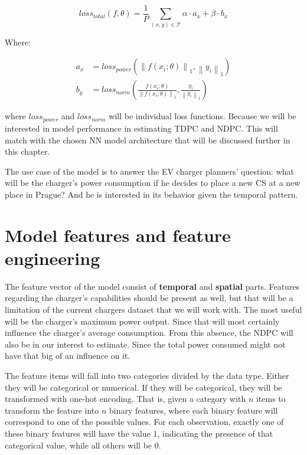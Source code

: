 \begin{equation}
    \mathit{loss_{total}}(f,\theta) = \frac{1}{P} \sum_{(x,y)\in\mathcal{T}} \alpha \cdot a_x + \beta \cdot b_x
\end{equation}

Where:

\begin{equation}
    \begin{split}
        a_x & = \mathit{loss_{power}}
        (\left \lVert f(x_i;\theta) \right \rVert_{1}, \left \lVert y_i \right \rVert_{1}) \\
        b_y & = \mathit{loss_{norm}}
        (\frac{f(x_i;\theta)}{\left \lVert f(x_i;\theta) \right \rVert_{1}}, \frac{y_i}{\left \lVert y_i \right \rVert_{1}})
    \end{split}
\end{equation}


where $\mathit{loss_{power}}$ and $\mathit{loss_{norm}}$ will be individual loss functions. Because we will be interested in model performance in estimating \acrfull{TDPC} and \acrfull{NDPC}. This will match with the chosen NN model architecture that will be discussed further in this chapter.

The use case of the model is to answer the EV charger planners' question: what will be the charger's power consumption if he decides to place a new \acrfull{CS} at a new place in Prague? And he is interested in its behavior given the temporal pattern.

\section{Model features and feature engineering}

The feature vector of the model consist of \textbf{temporal} and \textbf{spatial} parts. Features regarding the charger's capabilities should be present as well, but that will be a limitation of the current chargers dataset that we will work with. The most useful will be the charger's maximum power output. Since that will most certainly influence the charger's average consumption. From this absence, the \acrfull{NDPC} will also be in our interest to estimate. Since the total power consumed might not have that big of an influence on it.

The feature items will fall into two categories divided by the data type. Either they will be categorical or numerical. If they will be categorical, they will be transformed with one-hot encoding. That is, given a category with $n$ items to transform the feature into $n$ binary features, where each binary feature will correspond to one of the possible values. For each observation, exactly one of these binary features will have the value 1, indicating the presence of that categorical value, while all others will be 0.


